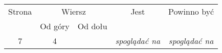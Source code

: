 \documentclass[a4paper,11pt]{article}
\numberwithin{equation}{section}
\begin{document}
\begin{center}

  \begin{tabular}{|c|c|c|c|c|}
    \hline
    Strona & \multicolumn{2}{c|}{Wiersz} & Jest
                              & Powinno być \\ \cline{2-3}
    & Od góry & Od dołu & & \\
    \hline
    7 &  4 & & \textit{spoglądać{ } na} & \textit{spoglądać na} \\
    \hline
  \end{tabular}






\end{center}
\end{document}
